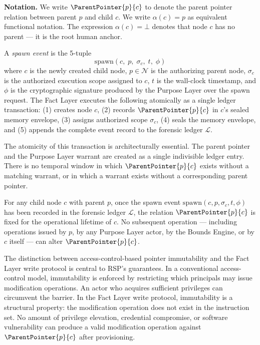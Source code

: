 \medskip
\noindent\textbf{Notation.} We write $\ParentPointer{p}{c}$ to denote the parent pointer relation between parent $p$ and child $c$. We write $\alpha(c) = p$ as equivalent functional notation. The expression $\alpha(c) = \bot$ denotes that node $c$ has no parent — it is the root human anchor.

\begin{dfn}\label{dfn:spawn-event}
A \emph{spawn event} is the 5-tuple
\begin{equation}
\mathrm{spawn}(c,\; p,\; \sigma_c,\; t,\; \phi)
\end{equation}
where $c$ is the newly created child node, $p \in \mathcal{N}$ is the authorizing parent node, $\sigma_c$ is the authorized execution scope assigned to $c$, $t$ is the wall-clock timestamp, and $\phi$ is the cryptographic signature produced by the Purpose Layer over the spawn request. The Fact Layer executes the following atomically as a single ledger transaction: (1) creates node $c$, (2) records $\ParentPointer{p}{c}$ in $c$'s sealed memory envelope, (3) assigns authorized scope $\sigma_c$, (4) seals the memory envelope, and (5) appends the complete event record to the forensic ledger $\mathcal{L}$.
\end{dfn}

The atomicity of this transaction is architecturally essential. The parent pointer and the Purpose Layer warrant are created as a single indivisible ledger entry. There is no temporal window in which $\ParentPointer{p}{c}$ exists without a matching warrant, or in which a warrant exists without a corresponding parent pointer.

\begin{prop}\label{prop:parent-pointer-immutable}
For any child node $c$ with parent $p$, once the spawn event $\mathrm{spawn}(c, p, \sigma_c, t, \phi)$ has been recorded in the forensic ledger $\mathcal{L}$, the relation $\ParentPointer{p}{c}$ is fixed for the operational lifetime of $c$. No subsequent operation — including operations issued by $p$, by any Purpose Layer actor, by the Bounds Engine, or by $c$ itself — can alter $\ParentPointer{p}{c}$.
\end{prop}

The distinction between access-control-based pointer immutability and the Fact Layer write protocol is central to RSP's guarantees. In a conventional access-control model, immutability is enforced by restricting which principals may issue modification operations. An actor who acquires sufficient privileges can circumvent the barrier. In the Fact Layer write protocol, immutability is a structural property: the modification operation does not exist in the instruction set. No amount of privilege elevation, credential compromise, or software vulnerability can produce a valid modification operation against $\ParentPointer{p}{c}$ after provisioning.

